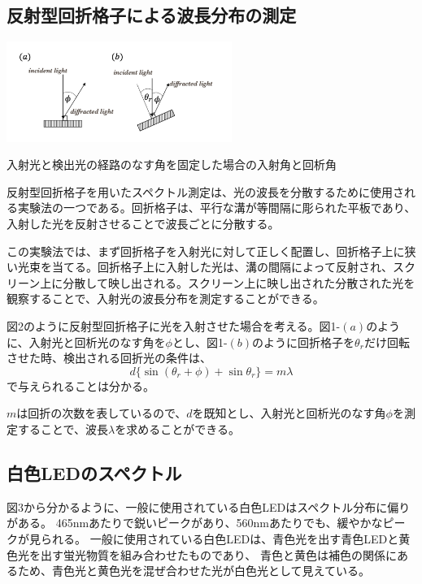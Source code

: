 \documentclass[a4paper,10pt]{jsarticle}
\makeatletter
\newenvironment{figurehere}
{\def\@captype{figure}}
{}
\makeatother
\begin{document}
\begin{multicols}{2}
\subsection{反射型回折格子による波長分布の測定}

\begin{figurehere}
\centering
\includegraphics[width=0.55\textwidth]{figs/kaisekikousi.pdf}
\caption{入射光と検出光の経路のなす角を固定した場合の入射角と回析角}
\label{fig:fig1}
\end{figurehere}
反射型回折格子を用いたスペクトル測定は、光の波長を分散するために使用される実験法の一つである。回折格子は、平行な溝が等間隔に彫られた平板であり、入射した光を反射させることで波長ごとに分散する。

この実験法では、まず回折格子を入射光に対して正しく配置し、回折格子上に狭い光束を当てる。回折格子上に入射した光は、溝の間隔によって反射され、スクリーン上に分散して映し出される。スクリーン上に映し出された分散された光を観察することで、入射光の波長分布を測定することができる。

図2のように反射型回折格子に光を入射させた場合を考える。図1-$(a)$のように、入射光と回析光のなす角を$\phi$とし、図1-$(b)$のように回折格子を$\theta_r$だけ回転させた時、検出される回折光の条件は、
\begin{equation}
  d\{\sin(\theta_r+\phi)+\sin\theta_r\} = m\lambda
\end{equation}
で与えられることは分かる。

$m$は回折の次数を表しているので、$d$を既知とし、入射光と回析光のなす角$\phi$を測定することで、波長$\lambda$を求めることができる。

\subsection{白色LEDのスペクトル}
図3から分かるように、一般に使用されている白色LEDはスペクトル分布に偏りがある。
465nmあたりで鋭いピークがあり、560nmあたりでも、緩やかなピークが見られる。
一般に使用されている白色LEDは、青色光を出す青色LEDと黄色光を出す蛍光物質を組み合わせたものであり、
青色と黄色は補色の関係にあるため、青色光と黄色光を混ぜ合わせた光が白色光として見えている。
\\


\end{multicols}
\end{document}
